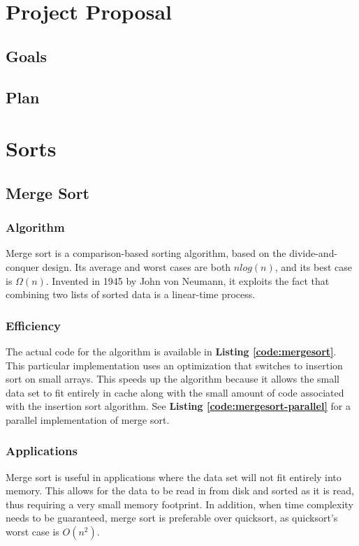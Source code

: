 \documentclass{article}
\author{Joseph Randall Hunt\\
Bobby Wertman\\
Western Carolina University,\\
Cullowhee, North Carolina\\
}
\date{\today}
\begin{document}
\maketitle
\section{Project Proposal}
   \subsection{Goals}
   \subsection{Plan}
\section{Sorts}
   \subsection{Merge Sort}
      \subsubsection{Algorithm}
        Merge sort is a comparison-based sorting algorithm, based on the
        divide-and-conquer design.  Its average and worst cases are both $n
        log(n)$, and its best case is $\Omega(n)$.  Invented in 1945 by John
        von Neumann, it exploits the fact that combining two lists of sorted
        data is a linear-time process.  
      \subsubsection{Efficiency}
        The actual code for the algorithm is available in \textbf{Listing
        \ref{code:mergesort}}.  This particular implementation uses an
        optimization that switches to insertion sort on small arrays.  This
        speeds up the algorithm because it allows the small data set to fit
        entirely in cache along with the small amount of code associated with
        the insertion sort algorithm.  See \textbf{Listing
        \ref{code:mergesort-parallel}} for a parallel implementation of merge
        sort.
      \subsubsection{Applications}
        Merge sort is useful in applications where the data set will not fit
        entirely into memory.  This allows for the data to be read in from disk
        and sorted as it is read, thus requiring a very small memory footprint.
        In addition, when time complexity needs to be guaranteed, merge sort is
        preferable over quicksort, as quicksort's worst case is $O(n^2)$.
\end{document}
